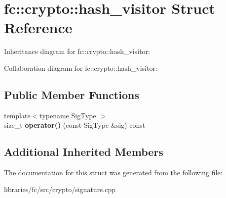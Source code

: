 \hypertarget{structfc_1_1crypto_1_1hash__visitor}{}\section{fc\+:\+:crypto\+:\+:hash\+\_\+visitor Struct Reference}
\label{structfc_1_1crypto_1_1hash__visitor}


Inheritance diagram for fc\+:\+:crypto\+:\+:hash\+\_\+visitor\+:


Collaboration diagram for fc\+:\+:crypto\+:\+:hash\+\_\+visitor\+:
\subsection*{Public Member Functions}
\begin{DoxyCompactItemize}
\item 
\mbox{\label{structfc_1_1crypto_1_1hash__visitor_acf367fa827ab81bc2ef53bdb15c1085b}} 
{\footnotesize template$<$typename Sig\+Type $>$ }\\size\+\_\+t {\bfseries operator()} (const Sig\+Type \&sig) const
\end{DoxyCompactItemize}
\subsection*{Additional Inherited Members}


The documentation for this struct was generated from the following file\+:\begin{DoxyCompactItemize}
\item 
libraries/fc/src/crypto/signature.\+cpp\end{DoxyCompactItemize}
